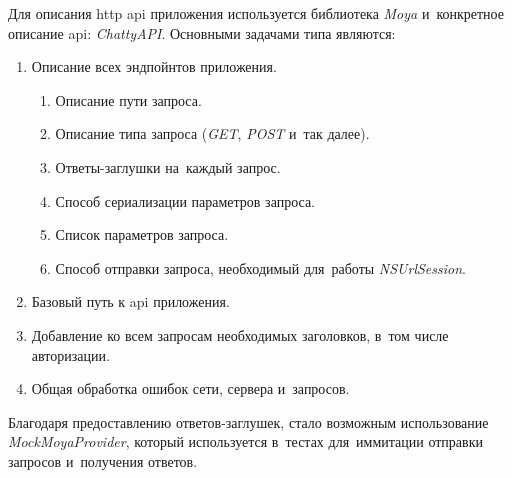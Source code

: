 Для описания \gls{http} \gls{api} приложения используется библиотека \textit{Moya} и~конкретное описание \gls{api}: \textit{ChattyAPI}. Основными задачами типа являются:
\begin{enumerate}
	\item Описание всех эндпойнтов приложения.
	\begin{enumerate}
		\item Описание пути запроса.
		\item Описание типа запроса (\textit{GET}, \textit{POST} и~так далее).
		\item Ответы-заглушки на~каждый запрос.
		\item Способ сериализации параметров запроса.
		\item Список параметров запроса.
		\item Способ отправки запроса, необходимый для~работы \textit{NSUrlSession}.
	\end{enumerate}
	\item Базовый путь к \gls{api} приложения.
	\item Добавление ко всем запросам необходимых заголовков, в~том числе авторизации.
	\item Общая обработка ошибок сети, сервера и~запросов.
\end{enumerate}

Благодаря предоставлению ответов-заглушек, стало возможным использование \textit{MockMoyaProvider}, который используется в~тестах для~иммитации отправки запросов и~получения ответов.